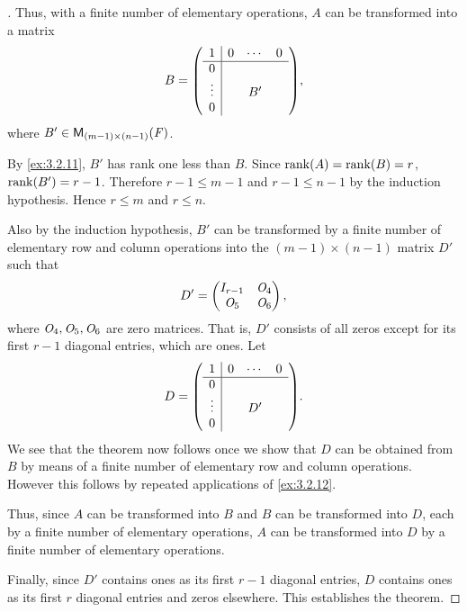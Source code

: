 \begin{proof}[]
  Thus, with a finite number of elementary operations, \(A\) can be transformed into a matrix
  \[
    B = \pa{\begin{array}{c|ccc}
        1      & 0 & \cdots & 0 \\
        \hline
        0      &   &        &   \\
        \vdots &   & B'     &   \\
        0      &   &        &
      \end{array}},
  \]
  where \(B' \in \ms[(m - 1)][(n - 1)][\F]\).

  By \cref{ex:3.2.11}, \(B'\) has rank one less than \(B\).
  Since \(\rk{A} = \rk{B} = r\), \(\rk{B'} = r - 1\).
  Therefore \(r - 1 \leq m - 1\) and \(r - 1 \leq n - 1\) by the induction hypothesis.
  Hence \(r \leq m\) and \(r \leq n\).

  Also by the induction hypothesis, \(B'\) can be transformed by a finite number of elementary row and column operations into the \((m-1) \times (n-1)\) matrix \(D'\) such that
  \[
    D' = \begin{pmatrix}
      I_{r - 1} & \mathit{O}_4 \\
      \mathit{O}_5     & \mathit{O}_6
    \end{pmatrix},
  \]
  where \(\mathit{O}_4, \mathit{O}_5, \mathit{O}_6\) are zero matrices.
  That is, \(D'\) consists of all zeros except for its first \(r - 1\) diagonal entries, which are ones.
  Let
  \[
    D = \pa{\begin{array}{c|ccc}
        1      & 0 & \cdots & 0 \\
        \hline
        0      &   &        &   \\
        \vdots &   & D'     &   \\
        0      &   &        &
      \end{array}}.
  \]
  We see that the theorem now follows once we show that \(D\) can be obtained from \(B\) by means of a finite number of elementary row and column operations.
  However this follows by repeated applications of \cref{ex:3.2.12}.

  Thus, since \(A\) can be transformed into \(B\) and \(B\) can be transformed into \(D\), each by a finite number of elementary operations, \(A\) can be transformed into \(D\) by a finite number of elementary operations.

  Finally, since \(D'\) contains ones as its first \(r - 1\) diagonal entries, \(D\) contains ones as its first \(r\) diagonal entries and zeros elsewhere.
  This establishes the theorem.
\end{proof}

